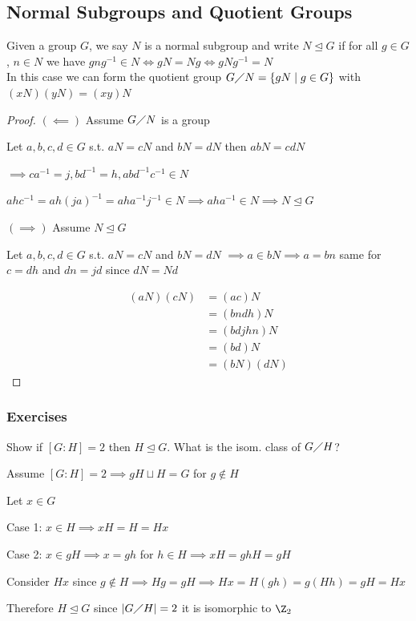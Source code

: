 \subsection{Normal Subgroups and Quotient Groups}

\begin{definition}
    Given a group $G$, we say $N$ is a normal subgroup and write
    $N \unlhd G$ if for all $g \in G$, $n \in N$ we have $gng^{-1}\in N \iff gN=Ng \iff gNg^{-1}=N$\\
    In this case we can form the quotient group $G\diagup N = \left\{ gN \mid g \in G \right\}$ with $(xN)(yN)=(xy)N$
\end{definition}

\begin{proof}
    \((\impliedby)\) Assume $G\diagup N$ is a group

    Let $a,b,c,d \in G$ s.t. $aN=cN$ and $bN=dN$ then $abN=cdN$

    $\implies ca^{-1}=j,bd^{-1}=h,abd^{-1}c^{-1}\in N$

    $ahc^{-1}=ah(ja)^{-1}=aha^{-1}j^{-1}\in N \implies aha^{-1}\in N \implies N \unlhd G$

    $(\implies)$ Assume $N \unlhd G$

    Let $a,b,c,d \in G$ s.t. $aN=cN$ and $bN=dN$ $\implies a\in bN \implies a=bn$ same for $c=dh$ and $dn=jd$ since $dN=Nd$

    \begin{align*}
        (aN)(cN)&=(ac)N\\
            &=(bndh)N\\
            &=(bdjhn)N\\
            &=(bd)N\\
            &=(bN)(dN)
    \end{align*}
\end{proof}

\newpage
\subsubsection{Exercises}
\begin{example}
    Show if $[G:H]=2$ then $H \unlhd G$. What is the isom. class of $G\diagup H$?

    Assume $[G:H]=2 \implies gH \sqcup H = G$ for $g \notin H$

    Let $x \in G$

    Case 1: $x \in H \implies xH=H=Hx$

    Case 2: $x \in gH \implies x=gh$ for $h \in H \implies xH=ghH=gH$

    Consider $Hx$ since $g \notin H \implies Hg=gH \implies Hx=H(gh)=g(Hh)=gH=Hx$

    Therefore $H \unlhd G$ since $|G\diagup H|=2$ it is isomorphic to $\Z_2$
\end{example}